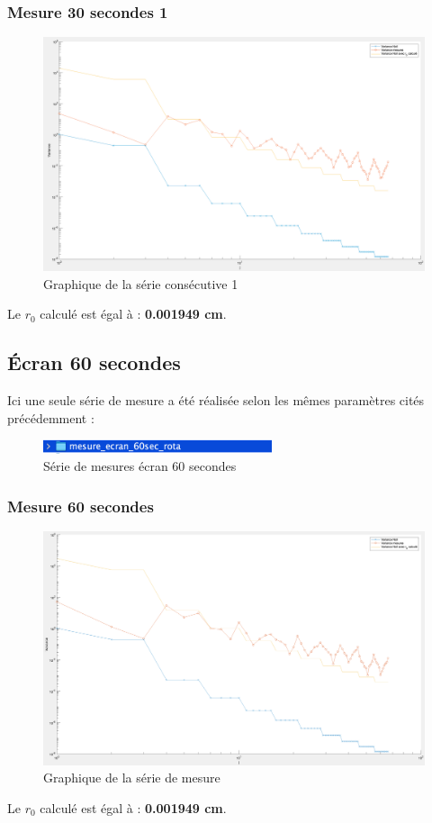 \subsubsection{Mesure 30 secondes 1}
\begin{figure}[H]
    \centering
    \includegraphics[width = \textwidth]{assets/figures/mesures/mesure_30_sec_1_plot.png}
    \caption{Graphique de la série consécutive 1}
\end{figure}
Le \textbf{$r_0$} calculé est égal à : \textbf{0.001949 cm}.

\subsection{Écran 60 secondes}
Ici une seule série de mesure a été réalisée selon les mêmes paramètres cités précédemment :
\begin{figure}[H]
    \centering
    \includegraphics[width = 0.6\textwidth]{assets/figures/mesures/serie_mesures_60_sec.png}
    \caption{Série de mesures écran 60 secondes}
\end{figure}
\subsubsection{Mesure 60 secondes }
\begin{figure}[H]
    \centering
    \includegraphics[width = \textwidth]{assets/figures/mesures/mesure_60_sec_1_plot.png}
    \caption{Graphique de la série de mesure}
\end{figure}
Le \textbf{$r_0$} calculé est égal à : \textbf{0.001949 cm}.

